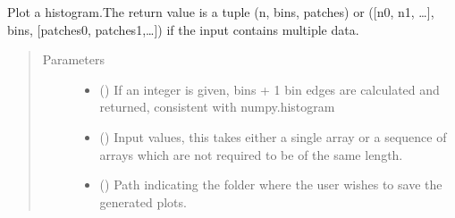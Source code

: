 \documentclass[letterpaper,10pt,english,openany, oneside]{sphinxmanual}
\begin{document}
\begin{fulllineitems}
\begin{fulllineitems}
\begin{fulllineitems}
Plot a histogram.The return value is a tuple (n, bins, patches) or ({[}n0, n1, …{]},
bins, {[}patches0, patches1,…{]}) if the input contains multiple data.

\end{fulllineitems}

\begin{quote}\begin{description}
\item[{Parameters}] \leavevmode\begin{itemize}
\item {} 
 () \textendash{} If an integer is given, bins + 1 bin edges are calculated and returned, consistent with
numpy.histogram

\item {} 
 (\sphinxstyleliteralemphasis{\sphinxupquote{, }}\sphinxstyleliteralemphasis{\sphinxupquote{ (}}\sphinxstyleliteralemphasis{\sphinxupquote{,}}\sphinxstyleliteralemphasis{\sphinxupquote{)}}) \textendash{} Input values, this takes either a single array or a sequence of arrays
which are not required to be of the same length.

\item {} 
 (\sphinxstyleliteralemphasis{\sphinxupquote{, }}) \textendash{} Path indicating the folder where the user wishes to save the generated plots.

\end{itemize}

\end{description}\end{quote}

\end{fulllineitems}


\begin{fulllineitems}
\label{\detokenize{index:fompy.plots.plotter.iv}}~


\end{fulllineitems}
\end{fulllineitems}
\end{document}
